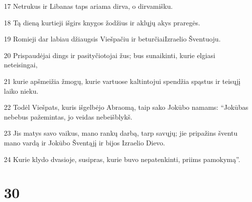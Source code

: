 \par 17 Netrukus ir Libanas taps ariama dirva, o dirva­mišku. 
\par 18 Tą dieną kurtieji išgirs knygos žodžius ir aklųjų akys praregės. 
\par 19 Romieji dar labiau džiaugsis Viešpačiu ir beturčiai­Izraelio Šventuoju. 
\par 20 Prispaudėjai dings ir pasityčiotojai žus; bus sunaikinti, kurie elgiasi neteisingai, 
\par 21 kurie apšmeižia žmogų, kurie vartuose kaltintojui spendžia spąstus ir teisųjį laiko nieku. 
\par 22 Todėl Viešpats, kuris išgelbėjo Abraomą, taip sako Jokūbo namams: “Jokūbas nebebus pažemintas, jo veidas nebeišblykš. 
\par 23 Jis matys savo vaikus, mano rankų darbą, tarp savųjų; jie pripažins šventu mano vardą ir Jokūbo Šventąjį ir bijos Izraelio Dievo. 
\par 24 Kurie klydo dvasioje, susipras, kurie buvo nepatenkinti, priims pamokymą”.



\chapter{30}


